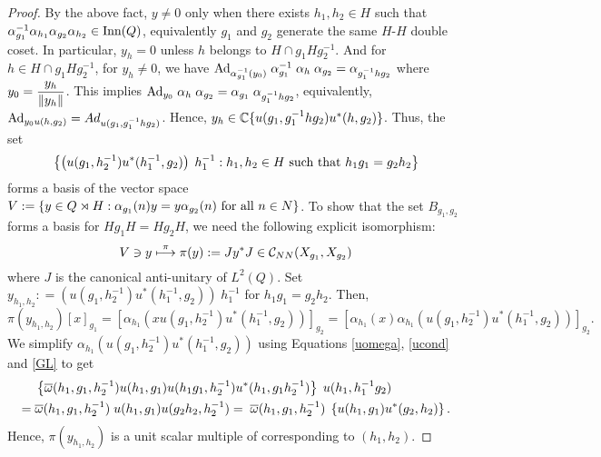 \begin{proof}
By the above fact, $ y \neq 0 $ only when there exists $ h_1 , h_2  \in H$ such that $ \alpha^{-1}_{g_1} \alpha_{h_1} \alpha_{g_2} \alpha_{h_2} \in \text{Inn} (Q)$, equivalently $ g_1 $ and $ g_2 $ generate the same $ H $-$ H $ double coset.
In particular, $ y_h = 0$ unless $ h $ belongs to $ H \cap g_1 H g^{-1}_2 $.
And for $ h \in  H \cap g_1 H g^{-1}_2$, for $ y_h \neq 0 $, we have $ \text{Ad}_{\alpha^{-1}_{g_1 } (y_0) } \; \alpha^{-1}_{g_1} \; \alpha_h \; \alpha_{g_2} = \alpha_{g^{-1}_1 h g_2} $ where $ y_0 = \displaystyle \frac{y_h}{\left\|{y_h}\right\|} $.
This implies $  \text{Ad}_{y_0} \; \alpha_h \; \alpha_{g_2} = \alpha_{g_1} \; \alpha_{g^{-1}_1 h g_2} $, equivalently, $  \text{Ad}_{y_0 u(h ,g_2) } = {Ad}_{u(g_1 , g^{-1}_1 h g_2) } $.
Hence, $ y_h \in \mathbb{C} \{u(g_1 , g^{-1}_1 h g_2) u^*(h ,g_2)\}$.
Thus, the set
\[
\left\{ \left(u (g_1 , h^{-1}_2 ) u^* (h^{-1}_1 ,g_2)\right) \; h^{-1}_1 : h_1, h_2 \in H \text{ such that } h_1 g_1 = g_2 h_2 \right\} 
\]
forms a basis of the vector space $ V:= \left\{ y \in Q \rtimes H : \alpha_{g_1} (n) y = y \alpha_{g_2} (n) \text{ for all } n \in N \right\} $.
To show that the set $ B_{g_1,g_2} $ forms a basis for $ Hg_1 H = H g_2 H $, we need the following explicit isomorphism:
\[
V \ni y \overset{\pi}{\longmapsto} \pi(y) := J y^* J \in  \mathcal C_{NN} (X_{g_1} , X_{g_2})
\]
where $ J $ is the canonical anti-unitary of $ L^2 (Q) $.
Set $ y_{h_1,h_2} : = \left(u (g_1 , h^{-1}_2 ) u^* (h^{-1}_1 ,g_2)\right) \; h^{-1}_1 $ for $ h_1 g_1 = g_2 h_2 $.
Then,
\[
\pi (y_{h_1,h_2}) [x]_{g_1} = \left[ \alpha_{h_1} \left( x u (g_1 , h^{-1}_2 ) u^* (h^{-1}_1 ,g_2 ) \right) \right]_{g_2} = \left[ \alpha_{h_1} \left( x \right) \alpha_{h_1} \left(u (g_1 , h^{-1}_2 ) u^* (h^{-1}_1 ,g_2 ) \right) \right]_{g_2}.
\]
We simplify $ \alpha_{h_1} \left(u (g_1 , h^{-1}_2 ) u^* (h^{-1}_1 ,g_2 ) \right) $ using Equations \ref{uomega}, \ref{ucond} and \ref{GL} to get
\begin{align*}
& \; \left\{ \overline{\omega} (h_1,g_1 , h^{-1}_2) u(h_1,g_1) u (h_1g_1 ,h^{-1}_2) u^*(h_1,g_1 h^{-1}_2)\right\} \; u(h_1 , h^{-1}_1 g_2) \\
= & \; \overline{\omega} (h_1,g_1 , h^{-1}_2) \; u(h_1,g_1) u (g_2 h_2 ,h^{-1}_2) = \; \overline{\omega} (h_1,g_1 , h^{-1}_2) \; \left\{u(h_1,g_1) u^* (g_2, h_2)\right\}.
\end{align*}
Hence, $ \pi (y_{h_1,h_2}) $ is a unit scalar multiple of 
corresponding to $ (h_1,h_2) $.
\end{proof}
